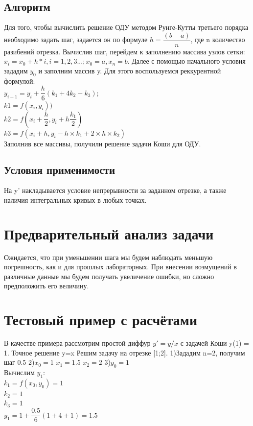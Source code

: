 \documentclass[a4paper]{article}
\begin{document}
\subsection{Алгоритм}
Для того, чтобы вычислить решение ОДУ методом Рунге-Кутты третьего порядка необходимо задать шаг, задается он по формуле $h=\dfrac{(b-a)}{n}$, где n количество разибений отрезка. Вычислив шаг, перейдем к заполнению массива узлов сетки: $x_i =x_0+h*i, i=1,2,3...; x_0=a, x_n=b$.
Далее с помощью начального условия зададим $y_0$ и заполним массив y. Для этого воспользуемся реккурентной формулой:\\ 
$y_{i+1} = y_i + \dfrac{h}{6}(k_1 + 4k_2 + k_3); $\\
$k1 = f(x_i,y_i))$\\
       $k2 = f( x_i + \dfrac{h}{2} , y_i + h\dfrac{k_1}{2})$\\
       $k3 = f( x_i + h , y_i - h \times k_1 + 2 \times h \times k_2)$\\
 Заполнив все массивы, получили решение задачи Коши для ОДУ.      
\subsection{Условия применимости}
На y' накладывается условие непрерывности за заданном отрезке, а также наличия интегральных кривых в любых точках.

 
\section{Предварительный анализ задачи} 
Ожидается, что при уменьшении шага мы будем наблюдать меньшую погрешность, как и для прошлых лабораторных. При внесении возмущений в различные данные мы будем получать увеличение ошибки, но сложно предположить его величину. 
\section{Тестовый пример с расчётами} 
В качестве примера рассмотрим простой диффур $y'=y/x$ с задачей Коши y(1) = 1. Точное решение y=x Решим задачу на отрезке [1;2].
1)Зададим n=2, получим шаг 0.5
2)$x_0= 1$ $x_1=1.5$  $x_2=2$
3)$y_0=1$\\
Вычислим $y_1$:\\
$k_1 = f(x_0,y_0)=1$\\
$k_2 =1$\\
$k_3 =1 $\\
$y_{1}=1+\dfrac{0.5}{6}(1+4+1)=1.5$\\
\end{document}

